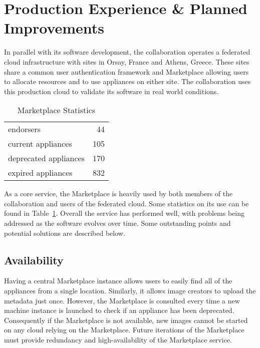 \section{Production Experience \& Planned Improvements}
\label{sec:production}

In parallel with its software development, the collaboration operates
a federated cloud infrastructure with sites in Orsay, France and
Athens, Greece\@.  These sites share a common user authentication
framework and Marketplace allowing users to allocate resources and to
use appliances on either site.  The collaboration uses this production
cloud to validate its software in real world conditions.

\begin{table}
\caption{Marketplace Statistics}
\label{tab:statistics}
\begin{center}
\begin{tabular}{lr}
\hline
\hline
endorsers & 44 \\
current appliances & 105 \\
deprecated appliances & 170 \\
expired appliances & 832 \\
\hline
\hline
\end{tabular}
\end{center}
\end{table}

As a core service, the Marketplace is heavily used by both members of
the collaboration and users of the federated cloud.  Some statistics
on its use can be found in Table~\ref{tab:statistics}.  Overall the
service has performed well, with problems being addressed as the
software evolves over time.  Some outstanding points and potential
solutions are described below.

\subsection{Availability}

Having a central Marketplace instance allows users to easily find all
of the appliances from a single location.  Similarly, it allows image
creators to upload the metadata just once.  However, the Marketplace
is consulted every time a new machine instance is launched to check if
an appliance has been deprecated.  Consequently if the Marketplace is
not available, new images cannot be started on any cloud relying on
the Marketplace\@.  Future iterations of the Marketplace must provide
redundancy and high-availability of the Marketplace service. 


